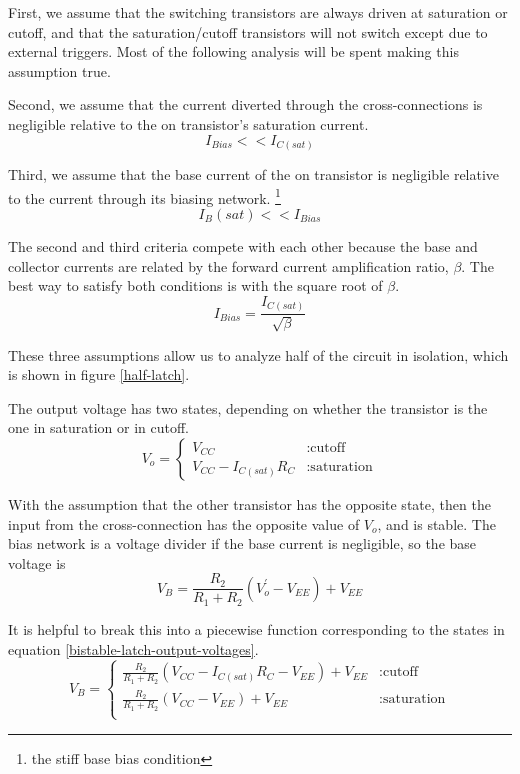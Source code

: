 \documentclass[titlepage, letterpaper, 10.5pt]{article}
\begin{document}
First, we assume that the switching transistors are always driven at saturation or cutoff,
and that the saturation/cutoff transistors will not switch except due to external triggers.
Most of the following analysis will be spent making this assumption true.

Second, we assume that the current diverted through the cross-connections is negligible
relative to the on transistor's saturation current.
\begin{equation*}
I_{Bias}<<I_{C(sat)}
\end{equation*}

Third, we assume that the base current of the on transistor is negligible
relative to the current through its biasing network.
\footnote{the stiff base bias condition}
\begin{equation*}
I_B(sat)<<I_{Bias}
\end{equation*}

The second and third criteria compete with each other because the base and collector currents
are related by the forward current amplification ratio, $\beta$.
The best way to satisfy both conditions is with the square root of $\beta$.
\begin{equation}
I_{Bias}=\frac{I_{C(sat)}}{\sqrt{\beta}}
\label{i-bias-eq}
\end{equation}

These three assumptions allow us to analyze half of the circuit in isolation, which is shown
in figure \ref{half-latch}.

The output voltage has two states, depending on whether the transistor is the one in saturation
or in cutoff.
\begin{equation}
V_{o}=\left\{
	\begin{array}{lr}
	V_{CC}	& : \textrm{cutoff} \\
	V_{CC}-I_{C(sat)}R_{C}	& : \textrm{saturation}
	\end{array}
\right.
\label{bistable-latch-output-voltages}
\end{equation}

With the assumption that the other transistor has the opposite state, then the input from the
cross-connection has the opposite value of $V_{o}$, and is stable. The bias network is a voltage
divider if the base current is negligible, so the base voltage is
\begin{equation*}
V_{B}=\frac{R_{2}}{R_{1}+R_{2}}(V_{o}^{'}-V_{EE})+V_{EE}
\end{equation*}

It is helpful to break this into a piecewise function corresponding to the states in equation
\ref{bistable-latch-output-voltages}.
\begin{equation}
V_{B}=\left\{
	\begin{array}{lr}
	\frac{R_{2}}{R_{1}+R_{2}}(V_{CC}-I_{C(sat)}R_{C}-V_{EE})+V_{EE}	& : \textrm{cutoff}	\\
	\frac{R_{2}}{R_{1}+R_{2}}(V_{CC}-V_{EE})+V_{EE}	& : \textrm{saturation}	\\
	\end{array}
\right.
\label{latch-b-equations}
\end{equation}
\end{document}
